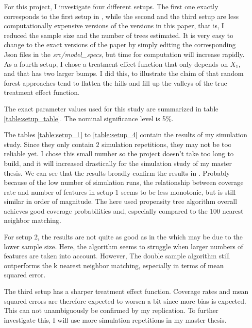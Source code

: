\documentclass[11pt, a4paper, leqno]{article}
\begin{document}
For this project, I investigate four different setups. The first one exactly corresponds to the first setup in \cite{wa18}, while the second and the third setup are less computationally expensive versions of the versions in this paper, that is, I reduced the sample size and the number of trees estimated. It is very easy to change to the exact versions of the paper by simply editing the corresponding Json files in the \textit{src/model\_specs}, but time for computation will increase rapidly. As a fourth setup, I chose a treatment effect function that only depends on \(X_1\), and that has two larger bumps. I did this, to illustrate the claim of \cite[p.~1238]{wa18} that random forest approaches tend to flatten the hills and fill up the valleys of the true treatment effect function.

 

The exact parameter values used for this study are summarized in table  \ref{table:setup_table}. The nominal significance level is 5\%.


\label{tab:setup_1}

The tables \ref{table:setup_1} to \ref{table:setup_4} contain the results of my simulation study. Since they only contain 2 simulation repetitions, they may not be too reliable yet. I chose this small number so the project doesn't take too long to build, and it will increased drastically for the simulation study of my master thesis.
We can see that the results broadly confirm the results in \cite[p.~1238 ff.]{wa18}. Probably because of the low number of simulation runs, the relationship between coverage rate and number of features in setup 1 seems to be less monotonic, but is still similar in order of magnitude. The here used propensity tree algorithm overall achieves good coverage probabilities and, especially compared to the 100 nearest neighbor matching. 



For setup 2, the results are not quite as good as in the \cite{wa18} which may be due to the lower sample size. Here, the algorithm seems to struggle when larger numbers of features are taken into account. However, The double sample algorithm still outperforms the k nearest neighbor matching, especially in terms of mean squared error. 



The third setup has a sharper treatment effect function. Coverage rates and mean squared errors are therefore expected to worsen a bit since more bias is expected. This can not unambiguously be confirmed by my replication. To further investigate this, I will use more simulation repetitions in my master thesis.
\end{document}
